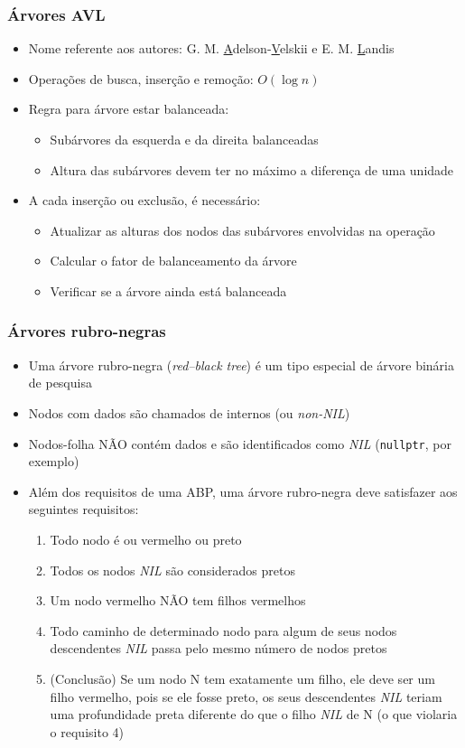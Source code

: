 \documentclass[aspectratio=169]{beamer}
\begin{document}
\begin{frame}\frametitle{Árvores AVL}
\begin{itemize}
	\item Nome referente aos autores: G. M. \underline{A}delson-\underline{V}elskii e E. M. \underline{L}andis
	\item Operações de busca, inserção e remoção: $O(\log{n})$	
	\item Regra para árvore estar balanceada:
	\begin{itemize}
		\item Subárvores da esquerda e da direita balanceadas
		\item Altura das subárvores devem ter no máximo a diferença de uma unidade
	\end{itemize}
	\item A cada inserção ou exclusão, é necessário:
	\begin{itemize}
		\item Atualizar as alturas dos nodos das subárvores envolvidas na operação
		\item Calcular o fator de balanceamento da árvore
		\item Verificar se a árvore ainda está balanceada
	\end{itemize}
\end{itemize}
\end{frame}

\begin{frame}\frametitle{Árvores rubro-negras}
\begin{itemize}
	\item Uma árvore rubro-negra (\emph{red–black tree}) é um tipo especial de árvore binária de pesquisa
	\item Nodos com dados são chamados de internos (ou \emph{non-NIL})
	\item Nodos-folha NÃO contém dados e são identificados como \emph{NIL} (\texttt{nullptr}, por exemplo)
	\item Além dos requisitos de uma ABP, uma árvore rubro-negra deve satisfazer aos seguintes requisitos:
	\begin{enumerate}
		\item Todo nodo é ou vermelho ou preto
		\item Todos os nodos \emph{NIL} são considerados pretos
		\item Um nodo vermelho NÃO tem filhos vermelhos
		\item Todo caminho de determinado nodo para algum de seus nodos descendentes \emph{NIL} passa pelo mesmo número de nodos pretos
		\item (Conclusão) Se um nodo N tem exatamente um filho, ele deve ser um filho vermelho, pois se ele fosse preto, os seus descendentes \emph{NIL} teriam uma profundidade preta diferente do que o filho \emph{NIL} de N (o que violaria o requisito 4)
	\end{enumerate}
\end{itemize}
\end{frame}
\end{document}
